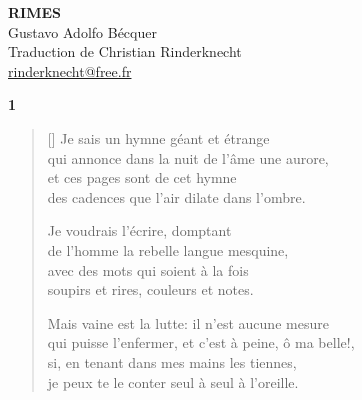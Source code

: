 \documentclass[a4paper,12pt]{book}
\begin{document}
\thispagestyle{empty}
\vspace*{70mm}
\begin{center}
{\Huge\textbf{RIMES}} \\
\vspace*{10mm}
{\Large Gustavo Adolfo Bécquer} \\
\vspace*{10mm}
Traduction de Christian Rinderknecht\\
\url{rinderknecht@free.fr}
\end{center}

\cleardoublepage

\frenchspacing  %



\newpage

\begin{center}
  \textbf{1}
\end{center}

\settowidth{\versewidth}{qui puisse l'enfermer, et c'est à peine, ô ma belle!,}

\begin{verse}[\versewidth]
  Je sais un hymne géant et étrange \\
  qui annonce dans la nuit de l'âme une aurore, \\
  et ces pages sont de cet hymne \\
  des cadences que l'air dilate dans l'ombre.

  Je voudrais l'écrire, domptant \\
  de l'homme la rebelle langue mesquine, \\
  avec des mots qui soient à la fois \\
  soupirs et rires, couleurs et notes.

  Mais vaine est la lutte: il n'est aucune mesure \\
  qui puisse l'enfermer, et c'est à peine, ô ma belle!, \\
  si, en tenant dans mes mains les tiennes, \\
  je peux te le conter seul à seul à l'oreille.
\end{verse}

\bigskip
\end{document}
